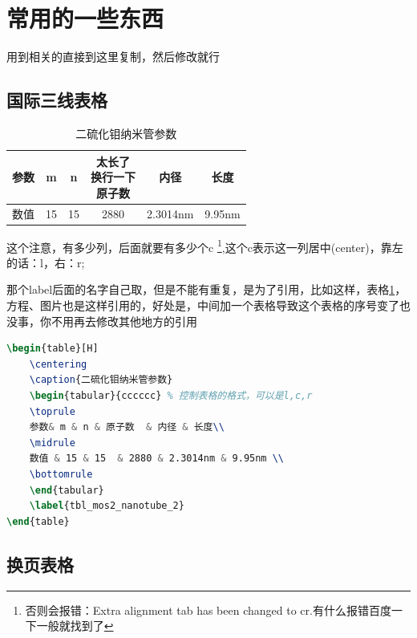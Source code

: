 \documentclass[AutoFakeBold]{LZUThesis2007}
\begin{document}
\section{常用的一些东西} %
\label{sec:常用的一些东西}

用到相关的直接到这里复制，然后修改就行

\subsection{国际三线表格} %
\label{sub:国际三线表格}

\begin{table}[H]
    \centering
    \caption{二硫化钼纳米管参数}
    \begin{tabular}{cccccc} %
    \toprule
    参数& m & n & \tabincell{c}{太长了\\换行一下\\原子数}  & 内径 & 长度\\
    \midrule
    数值 & 15 & 15  & 2880 & 2.3014nm & 9.95nm \\
    \bottomrule
    \end{tabular}
    \label{tbl_mos2_nanotube}
\end{table}

这个注意，有多少列，后面就要有多少个c \footnote{否则会报错：Extra alignment tab has been changed to cr.有什么报错百度一下一般就找到了},这个c表示这一列居中(center)，靠左的话：l，右：r;

那个label后面的名字自己取，但是不能有重复，是为了引用，比如这样，表格\ref{tbl_mos2_nanotube}，方程、图片也是这样引用的，好处是，中间加一个表格导致这个表格的序号变了也没事，你不用再去修改其他地方的引用

\begin{lstlisting}[language = tex]
\begin{table}[H]
    \centering
    \caption{二硫化钼纳米管参数}
    \begin{tabular}{cccccc} % 控制表格的格式，可以是l,c,r
    \toprule
    参数& m & n & 原子数  & 内径 & 长度\\
    \midrule
    数值 & 15 & 15  & 2880 & 2.3014nm & 9.95nm \\
    \bottomrule
    \end{tabular}
    \label{tbl_mos2_nanotube_2}
\end{table}
\end{lstlisting}

\subsection{换页表格} %
\end{document}
